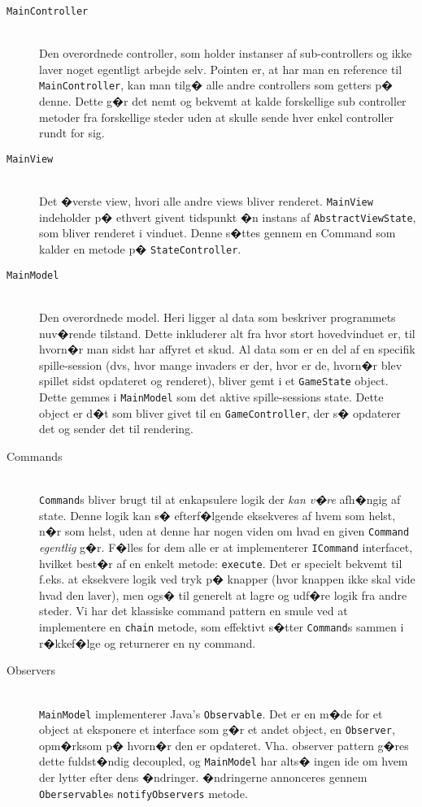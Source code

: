\documentclass[danish]{article}
\newcommand{\code}[1]{\texttt{#1}}
\begin{document}
\begin{description}
\item[\code{MainController}] \hfill \\
  Den overordnede controller, som holder instanser af sub-controllers og ikke laver noget egentligt
  arbejde selv. Pointen er, at har man en reference til \code{MainController}, kan man tilg� alle
  andre controllers som getters p� denne. Dette g�r det nemt og bekvemt at kalde forskellige sub
  controller metoder fra forskellige steder uden at skulle sende hver enkel controller rundt for
  sig.

\item[\code{MainView}]  \hfill \\
  Det �verste view, hvori alle andre views bliver renderet. \code{MainView} indeholder p� ethvert
  givent tidspunkt �n instans af \code{AbstractViewState}, som bliver renderet i vinduet. Denne
  s�ttes gennem en Command som kalder en metode p� \code{StateController}.

\item[\code{MainModel}]  \hfill \\
  Den overordnede model. Heri ligger al data som beskriver programmets nuv�rende tilstand. Dette
  inkluderer alt fra hvor stort hovedvinduet er, til hvorn�r man sidst har affyret et skud. Al data
  som er en del af en specifik spille-session (dvs, hvor mange invaders er der, hvor er de, hvorn�r
  blev spillet sidst opdateret og renderet), bliver gemt i et \code{GameState} object. Dette gemmes
  i \code{MainModel} som det aktive spille-sessions state. Dette object er d�t som bliver givet til
  en \code{GameController}, der s� opdaterer det og sender det til rendering.

\item[Commands] \hfill \\
  \code{Command}s bliver brugt til at enkapsulere logik der \emph{kan v�re} afh�ngig af state. Denne
  logik kan s� efterf�lgende eksekveres af hvem som helst, n�r som helst, uden at denne har nogen
  viden om hvad en given \code{Command} \emph{egentlig} g�r. F�lles for dem alle er at implementerer
  \code{ICommand} interfacet, hvilket best�r af en enkelt metode: \code{execute}.  Det er specielt
  bekvemt til f.eks. at eksekvere logik ved tryk p� knapper (hvor knappen ikke skal vide hvad den
  laver), men ogs� til generelt at lagre og udf�re logik fra andre steder.  Vi har det klassiske
  command pattern en smule ved at implementere en \code{chain} metode, som effektivt s�tter
  \code{Command}s sammen i r�kkef�lge og returnerer en ny command.

\item[Observers] \hfill \\
  \code{MainModel} implementerer Java's \code{Observable}. Det er en m�de for et object at eksponere
  et interface som g�r et andet object, en \code{Observer}, opm�rksom p� hvorn�r den er
  opdateret. Vha. observer pattern g�res dette fuldst�ndig decoupled, og \code{MainModel} har alts�
  ingen ide om hvem der lytter efter dens �ndringer. �ndringerne annonceres gennem
  \code{Oberservable}s \code{notifyObservers} metode.
\end{description}
\end{document}
